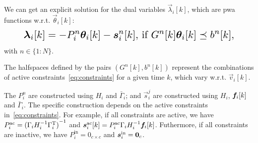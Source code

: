 \documentclass{ifacconf}  %
\begin{document}
We can get an explicit solution for the dual variables $\vec{\lambda}_{i}[k]$, which are \acrfull{pwa} functions w.r.t. $\vec{\theta}_{i}[k]$:
\begin{equation}
\resizebox{.88\columnwidth}{!}{$
  \begin{aligned}\label{eq:lambdafuntheta}
    \lambdaik=
      -P_{i}^{n}\thetaik-\vec{s}_{i}^{n}[k]\text{, if}\ G^{n}[k]\thetaik \preceq b^{n}[k],
  \end{aligned}
  $}
\end{equation}
with $n\in\{1\mathbin{:}N\}$.

The halfspaces defined by the pairs $(G^{n}[k],b^{n}[k])$ represent the combinations of active constraints~\eqref{eq:constraints} for a given time $k$, which vary w.r.t. $\vec{v}_{i}[k]$.

The $P_{i}^{n}$ are constructed using $H_{i}$ and $\bar{\Gamma}_{i}$; and $\vec{s}_{i}^{j}$ are constructed using $H_{i}$, $\fik$ and $\bar{\Gamma}_{i}$. The specific construction depends on the active constraints in~\eqref{eq:constraints}.
For example, if all constraints are active, we have ${P_{i}^{\text{ac}}={(\relax{\Gamma}_{i}H_{i}^{-1}\relax{\Gamma}_{i}^{\mathrm{T}})}^{-1}}$ and ${\vec{s}_{i}^{\text{ac}}[k]=P_{i}^{\text{ac}}\bar{\Gamma}_{i}H_{i}^{-1}\fik}$.
Futhermore, if all constraints are inactive, we have ${P_{i}^{\text{in}}=0_{c\times c}}$ and ${\boldsymbol{s}_{i}^{\text{in}}=\mathbf{0}_{c}}$.

\end{document}
